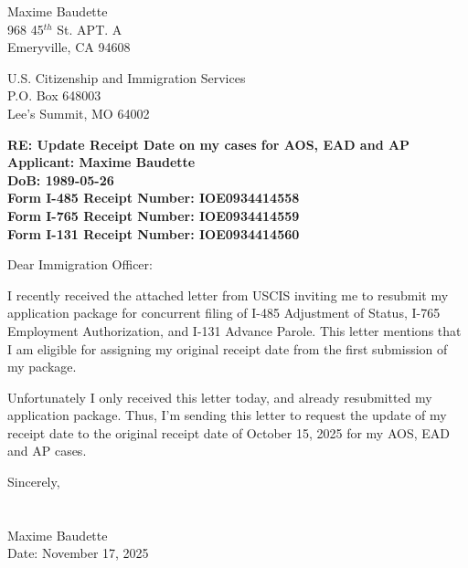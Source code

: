 \documentclass[12pt,letterpaper]{article}
\newcommand{\myFirstName}[0]{Maxime}
\newcommand{\myLastName}[0]{Baudette}
\newcommand{\myDOB}[0]{1989-05-26}
\newcommand{\myAddress}[0]{%
\myFirstName {} \myLastName\\
968 45$^{th}$ St. APT. A\\
Emeryville, CA 94608
}
\newcommand{\USCISaddress}[0]{%
U.S. Citizenship and Immigration Services\\
P.O. Box 648003\\
Lee's Summit, MO 64002}
\newcommand{\myAOScase}[0]{IOE0934414558}
\newcommand{\myEADcase}[0]{IOE0934414559}
\newcommand{\myAPcase}[0]{IOE0934414560}
\newcommand{\AOS}[0]{I-485 Adjustment of Status}
\newcommand{\EAD}[0]{I-765 Employment Authorization}
\newcommand{\AP}[0]{I-131 Advance Parole}
\newcommand{\letterSignature}[0]{%
\vspace{0.5cm}
Sincerely,\\
\\
\\
\myFirstName {} \myLastName \\
Date: November 17, 2025}
\begin{document}
\setcounter{page}{1}
\pagestyle{fancy}
\fancyhf{}
\rhead{\myFirstName {} \myLastName}


\myAddress

\USCISaddress

\textbf{RE: Update Receipt Date on my cases for AOS, EAD and AP} \\
\textbf{Applicant: \myFirstName {} \myLastName} \\
\textbf{DoB: \myDOB} \\
\textbf{Form I-485 Receipt Number: \myAOScase} \\
\textbf{Form I-765 Receipt Number: \myEADcase} \\
\textbf{Form I-131 Receipt Number: \myAPcase}

Dear Immigration Officer:

I recently received the attached letter from USCIS inviting me to resubmit my application package for concurrent filing of \AOS, \EAD, and \AP.
This letter mentions that I am eligible for assigning my original receipt date from the first submission of my package.

Unfortunately I only received this letter today, and already resubmitted my application package. Thus, I'm sending this letter to request the update of my receipt date to the original receipt date of October 15, 2025 for my AOS, EAD and AP cases. 

\letterSignature
\label{endOfCoverLetter}
\clearpage
\end{document}
